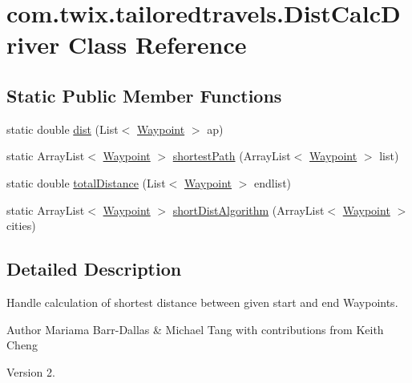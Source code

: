 \hypertarget{classcom_1_1twix_1_1tailoredtravels_1_1_dist_calc_driver}{\section{com.\-twix.\-tailoredtravels.\-Dist\-Calc\-Driver Class Reference}
\label{classcom_1_1twix_1_1tailoredtravels_1_1_dist_calc_driver}
}
\subsection*{Static Public Member Functions}
\begin{DoxyCompactItemize}
\item 
static double \hyperlink{classcom_1_1twix_1_1tailoredtravels_1_1_dist_calc_driver_ac157f7fde2a521a42b6d8c743d61c75c}{dist} (List$<$ \hyperlink{classcom_1_1twix_1_1tailoredtravels_1_1_waypoint}{Waypoint} $>$ ap)
\item 
static Array\-List$<$ \hyperlink{classcom_1_1twix_1_1tailoredtravels_1_1_waypoint}{Waypoint} $>$ \hyperlink{classcom_1_1twix_1_1tailoredtravels_1_1_dist_calc_driver_a98c2ee80127771fac65d05793883e6c0}{shortest\-Path} (Array\-List$<$ \hyperlink{classcom_1_1twix_1_1tailoredtravels_1_1_waypoint}{Waypoint} $>$ list)
\item 
static double \hyperlink{classcom_1_1twix_1_1tailoredtravels_1_1_dist_calc_driver_a6064db847d42f19c8e159e8cd3c9ebdd}{total\-Distance} (List$<$ \hyperlink{classcom_1_1twix_1_1tailoredtravels_1_1_waypoint}{Waypoint} $>$ endlist)
\item 
static Array\-List$<$ \hyperlink{classcom_1_1twix_1_1tailoredtravels_1_1_waypoint}{Waypoint} $>$ \hyperlink{classcom_1_1twix_1_1tailoredtravels_1_1_dist_calc_driver_ad866a4bf497d195874a00d66f7f1c4f4}{short\-Dist\-Algorithm} (Array\-List$<$ \hyperlink{classcom_1_1twix_1_1tailoredtravels_1_1_waypoint}{Waypoint} $>$ cities)
\end{DoxyCompactItemize}


\subsection{Detailed Description}
Handle calculation of shortest distance between given start and end Waypoints.

\begin{DoxyAuthor}{Author}
Mariama Barr-\/\-Dallas \& Michael Tang with contributions from Keith Cheng 
\end{DoxyAuthor}
\begin{DoxyVersion}{Version}
2. 
\end{DoxyVersion}


